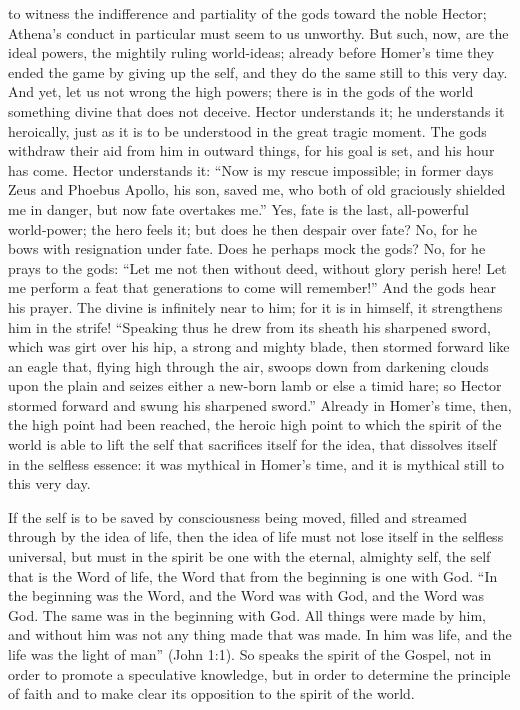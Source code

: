 \documentclass[12pt]{book}
\newcommand{\opage}[1]{\marginnote{\footnotesize\textit{[#1]}}}
\begin{document}
to witness the indifference and partiality of the gods toward the noble
Hector; Athena's conduct in particular must seem to us unworthy. But
such, now, are the ideal powers, the mightily ruling world-ideas;
already before Homer's time they ended the game by giving up the self,
and they do the same still to this very day. And yet, let us not wrong
the high powers; there is in the gods of the world something divine
that does not deceive. Hector understands it; he understands it
heroically, just as it is to be understood in the great tragic moment.
The gods withdraw their aid from him in outward things, for his goal is
set, and his hour has come. Hector understands it: ``Now is my rescue
impossible; in former days Zeus and Phoebus Apollo, his son, saved me,
who both of old graciously shielded me in danger, but now fate overtakes
me.'' Yes, fate is the last, all-powerful world-power; the hero feels it;
but does he then despair over fate? No, for he bows with resignation
under fate. Does he perhaps mock the gods? No, for he prays to the gods:
``Let me not then without deed, without glory perish here! Let me
perform a feat that generations to come will remember!'' And the gods
hear his prayer. The divine
\opage{43}\setcounter{footnote}{0}%
is infinitely near to him; for it is in himself, it strengthens him in
the strife! ``Speaking thus he drew from its sheath his sharpened sword,
which was girt over his hip, a strong and mighty blade, then stormed
forward like an eagle that, flying high through the air, swoops down
from darkening clouds upon the plain and seizes either a new-born lamb or
else a timid hare; so Hector stormed forward and swung his sharpened
sword.'' Already in Homer's time, then, the high point had been
reached, the heroic high point to which the spirit of the world is able
to lift the self that sacrifices itself for the idea, that dissolves
itself in the selfless essence: it was mythical in Homer's time, and it
is mythical still to this very day.

If the self is to be saved by consciousness being moved, filled and
streamed through by the idea of life, then the idea of life must not
lose itself in the selfless universal, but must in the spirit be one
with the eternal, almighty self, the self that is the Word of life, the
Word that from the beginning is one with God. ``In the beginning was the
Word, and the Word was with God, and the Word was God. The same was in
the beginning with God. All things were made by him, and without him was
not any thing made that was made. In him was life, and the life was the
light of man'' (John 1:1).
So speaks the spirit of the Gospel, not in order to promote a
speculative knowledge, but in order to determine the principle of faith
and to make clear its opposition to the spirit of the world.
\end{document}
